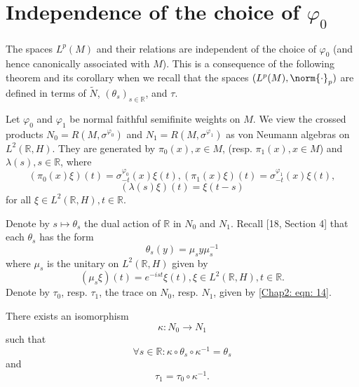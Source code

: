 \section{Independence of the choice of $\varphi_0$}
The spaces $L^p(M)$ and their relations are independent of the choice of $\varphi_0$ (and hence canonically associated with $M$). This is a consequence of the following theorem and its corollary when we recall that the spaces $(L^p(M), \norm{\cdot}_p)$ are defined in terms of $\tilde{N}$, $(\theta_s)_{s\in \mathbb{R}}$, and $\tau$.\par
Let $\varphi_0$ and $\varphi_1$ be normal faithful semifinite weights on $M$. We view the crossed products $N_0=R(M,\sigma^{\varphi_0})$ and $N_1=R(M,\sigma^{\varphi_1})$ as von Neumann algebras on $L^2(\mathbb{R},H)$. They are generated by $\pi_0(x), x\in M$, (resp. $\pi_1(x), x\in M$) and $\lambda(s),s\in \mathbb{R}$, where
\[
    (\pi_0(x)\xi)(t)=\sigma_{-t}^{\varphi_0}(x)\xi(t),(\pi_1(x)\xi)(t)=\sigma_{-t}^{\varphi_1}(x)\xi(t),
\]
\[
    (\lambda(s)\xi)(t)=\xi(t-s)
\]
for all $\xi\in L^2(\mathbb{R},H), t\in \mathbb{R}$.\par
Denote by $s\mapsto \theta_s$ the dual action of $\mathbb{R}$ in $N_0$ and $N_1$. Recall [18, Section 4] that each $\theta_s$ has the form
\begin{equation}
    \theta_s(y)=\mu_sy\mu_s^{-1}
\end{equation}
where $\mu_s$ is the unitary on $L^2(\mathbb{R},H)$ given by
\begin{equation}\label{Chap2: eqn: 46}
    (\mu_s\xi)(t)=e^{-ist}\xi(t),\xi\in L^2(\mathbb{R},H),t\in \mathbb{R}.
\end{equation}
Denote by $\tau_0$, resp. $\tau_1$, the trace on $N_0$, resp. $N_1$, given by \eqref{Chap2: eqn: 14}.
\begin{theorem}
    There exists an isomorphism
    \[
        \kappa:N_0\to N_1
    \]
    such that
    \begin{equation}\label{Chap2: eqn: 47}
        \forall s\in \mathbb{R}:\kappa\circ\theta_s\circ\kappa^{-1}=\theta_s
    \end{equation}
    and
    \begin{equation}
        \tau_1=\tau_0\circ\kappa^{-1}.
    \end{equation}
\end{theorem}
